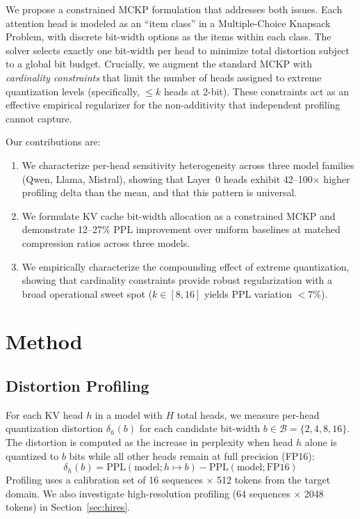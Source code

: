 \documentclass[11pt,a4paper]{article}
\begin{document}
We propose a constrained MCKP formulation that addresses both issues.
Each attention head is modeled as an ``item class'' in a Multiple-Choice Knapsack Problem, with discrete bit-width options as the items within each class.
The solver selects exactly one bit-width per head to minimize total distortion subject to a global bit budget.
Crucially, we augment the standard MCKP with \emph{cardinality constraints} that limit the number of heads assigned to extreme quantization levels (specifically, $\leq k$ heads at 2-bit).
These constraints act as an effective empirical regularizer for the non-additivity that independent profiling cannot capture.

Our contributions are:
\begin{enumerate}
\item We characterize per-head sensitivity heterogeneity across three model families (Qwen, Llama, Mistral), showing that Layer~0 heads exhibit 42--100$\times$ higher profiling delta than the mean, and that this pattern is universal.
\item We formulate KV cache bit-width allocation as a constrained MCKP and demonstrate 12--27\% PPL improvement over uniform baselines at matched compression ratios across three models.
\item We empirically characterize the compounding effect of extreme quantization, showing that cardinality constraints provide robust regularization with a broad operational sweet spot ($k \in [8, 16]$ yields PPL variation $<7$\%).
\end{enumerate}

\section{Method}
\label{sec:method}

\subsection{Distortion Profiling}

For each KV head $h$ in a model with $H$ total heads, we measure per-head quantization distortion $\delta_h(b)$ for each candidate bit-width $b \in \mathcal{B} = \{2, 4, 8, 16\}$.
The distortion is computed as the increase in perplexity when head $h$ alone is quantized to $b$ bits while all other heads remain at full precision (FP16):
\begin{equation}
\delta_h(b) = \text{PPL}(\text{model}; h \mapsto b) - \text{PPL}(\text{model}; \text{FP16})
\end{equation}
Profiling uses a calibration set of 16 sequences $\times$ 512 tokens from the target domain. We also investigate high-resolution profiling (64 sequences $\times$ 2048 tokens) in Section~\ref{sec:hires}.
\end{document}
